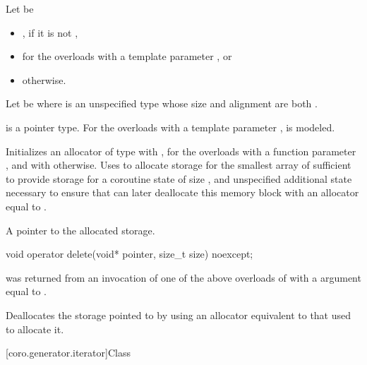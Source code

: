 \begin{itemdescr}
\pnum
Let  be
\begin{itemize}
\item
{}, if it is not ,
\item
{} for the overloads with a template parameter , or
\item
{} otherwise.
\end{itemize}
Let  be 
where  is an unspecified type whose size and alignment
are both .

\pnum
\mandates
{} is a pointer type.
For the overloads with a template parameter ,
is modeled.

\pnum
\effects
Initializes an allocator  of type  with ,
for the overloads with a function parameter ,
and with  otherwise.
Uses  to allocate storage for the smallest array
of  sufficient to provide storage for
a coroutine state of size , and
unspecified additional state necessary to ensure that
 can later deallocate this memory block
with an allocator equal to .

\pnum
\returns
A pointer to the allocated storage.
\end{itemdescr}

%
\begin{itemdecl}
void operator delete(void* pointer, size_t size) noexcept;
\end{itemdecl}

\begin{itemdescr}
\pnum
\expects
{} was returned from an invocation of
one of the above overloads of 
with a  argument equal to .

\pnum
\effects
Deallocates the storage pointed to by 
using an allocator equivalent to that used to allocate it.
\end{itemdescr}

[coro.generator.iterator]{Class }

